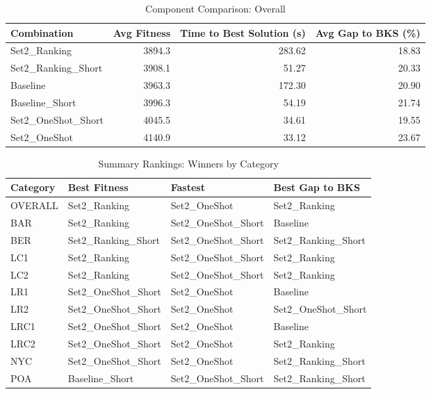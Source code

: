 \documentclass{article}
\begin{document}
\begin{table}[htbp]
\centering
\caption{Component Comparison: Overall}
\label{tab:comparison_overall}
\begin{tabular}{lrrr}
\toprule
Combination & Avg Fitness & Time to Best Solution (s) & Avg Gap to BKS (\%) \\
\midrule
Set2\_Ranking & 3894.3 & 283.62 & 18.83 \\
Set2\_Ranking\_Short & 3908.1 & 51.27 & 20.33 \\
Baseline & 3963.3 & 172.30 & 20.90 \\
Baseline\_Short & 3996.3 & 54.19 & 21.74 \\
Set2\_OneShot\_Short & 4045.5 & 34.61 & 19.55 \\
Set2\_OneShot & 4140.9 & 33.12 & 23.67 \\
\bottomrule
\end{tabular}
\end{table}

\begin{table}[htbp]
\centering
\caption{Summary Rankings: Winners by Category}
\label{tab:summary_rankings}
\begin{tabular}{llll}
\toprule
Category & Best Fitness & Fastest & Best Gap to BKS \\
\midrule
OVERALL & Set2\_Ranking & Set2\_OneShot & Set2\_Ranking \\
BAR & Set2\_Ranking & Set2\_OneShot\_Short & Baseline \\
BER & Set2\_Ranking\_Short & Set2\_OneShot\_Short & Set2\_Ranking\_Short \\
LC1 & Set2\_Ranking & Set2\_OneShot\_Short & Set2\_Ranking \\
LC2 & Set2\_Ranking & Set2\_OneShot\_Short & Set2\_Ranking \\
LR1 & Set2\_OneShot\_Short & Set2\_OneShot & Baseline \\
LR2 & Set2\_OneShot\_Short & Set2\_OneShot & Set2\_OneShot\_Short \\
LRC1 & Set2\_OneShot\_Short & Set2\_OneShot & Baseline \\
LRC2 & Set2\_OneShot\_Short & Set2\_OneShot & Set2\_Ranking \\
NYC & Set2\_OneShot\_Short & Set2\_OneShot & Set2\_Ranking\_Short \\
POA & Baseline\_Short & Set2\_OneShot\_Short & Set2\_Ranking\_Short \\
\bottomrule
\end{tabular}
\end{table}
\end{document}
